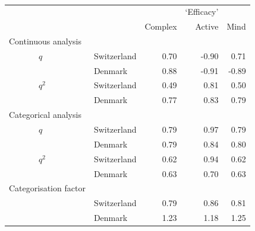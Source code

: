 \documentclass[a4paper,12pt]{article}
\begin{document}
\begin{table}\centering\caption{\label{tab:efficacy}}\begin{tabular}{lllrrr}
\hline
 &  &  &  & `Efficacy' & \\
	   &  &  & Complex & Active & Mind\\
	   \hline
 \multicolumn{2}{l}{Continuous analysis}\\
	 & $q$ & Switzerland & 0.70 & -0.90 & 0.71\\
 &  & Denmark & 0.88 & -0.91 & -0.89\\
 & $q^2$ & Switzerland & 0.49 & 0.81 & 0.50\\
 &  & Denmark & 0.77 & 0.83 & 0.79\\
\multicolumn{2}{l}{Categorical analysis}   &  &  &  & \\
 & $q$ & Switzerland & 0.79 & 0.97 & 0.79\\
 &  & Denmark & 0.79 & 0.84 & 0.80\\
 & $q^2$ & Switzerland & 0.62 & 0.94 & 0.62\\
 &  & Denmark & 0.63 & 0.70 & 0.63\\
\multicolumn{2}{l}{Categorisation factor}    &  &  & \\
 &  & Switzerland & 0.79 & 0.86 & 0.81\\
 &  & Denmark & 1.23 & 1.18 & 1.25\\

\hline
\end{tabular}\end{table}
\end{document}

